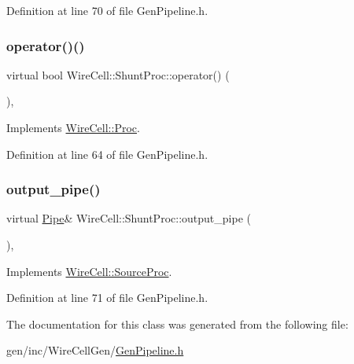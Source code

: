 Definition at line 70 of file Gen\+Pipeline.\+h.

\mbox{\label{class_wire_cell_1_1_shunt_proc_a6fdf92dd0aa7ca22e8898b3a6802c923}} 
\subsubsection{\texorpdfstring{operator()()}{operator()()}}
{\footnotesize\ttfamily virtual bool Wire\+Cell\+::\+Shunt\+Proc\+::operator() (\begin{DoxyParamCaption}{ }\end{DoxyParamCaption})\hspace{0.3cm}{\ttfamily [inline]}, {\ttfamily [virtual]}}



Implements \hyperlink{class_wire_cell_1_1_proc_a9c642ed1f6b6741633c6cb1bd063b502}{Wire\+Cell\+::\+Proc}.



Definition at line 64 of file Gen\+Pipeline.\+h.

\mbox{\label{class_wire_cell_1_1_shunt_proc_ad03629b595bca9460788378fc2533518}} 
\subsubsection{\texorpdfstring{output\+\_\+pipe()}{output\_pipe()}}
{\footnotesize\ttfamily virtual \hyperlink{namespace_wire_cell_afce9bb01c731347c3d4c8ca9d4ed804f}{Pipe}\& Wire\+Cell\+::\+Shunt\+Proc\+::output\+\_\+pipe (\begin{DoxyParamCaption}{ }\end{DoxyParamCaption})\hspace{0.3cm}{\ttfamily [inline]}, {\ttfamily [virtual]}}



Implements \hyperlink{class_wire_cell_1_1_source_proc_a480b8ba5e80e9e7c6ffdf0b5d9fd0578}{Wire\+Cell\+::\+Source\+Proc}.



Definition at line 71 of file Gen\+Pipeline.\+h.



The documentation for this class was generated from the following file\+:\begin{DoxyCompactItemize}
\item 
gen/inc/\+Wire\+Cell\+Gen/\hyperlink{_gen_pipeline_8h}{Gen\+Pipeline.\+h}\end{DoxyCompactItemize}

